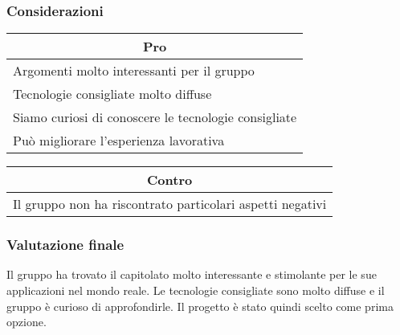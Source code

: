 \subsubsection{Considerazioni}
\begin{minipage}[t]{0.45\linewidth}
    \vspace{0pt}
    {\renewcommand{\arraystretch}{1.5}
    \begin{tabular}{p{1\linewidth}}
        \multicolumn{1}{c}{\textbf{Pro}} \\
        \midrule
        Argomenti molto interessanti per il gruppo \\
        Tecnologie consigliate molto diffuse \\
        Siamo curiosi di conoscere le tecnologie consigliate \\
        Può migliorare l’esperienza lavorativa  \\
        \hline
    \end{tabular}
    }
\end{minipage}
\hspace{0.05\linewidth}
\begin{minipage}[t]{0.45\linewidth}
    \vspace{0pt}
    {\renewcommand{\arraystretch}{1.5}
    \begin{tabular}{p{1\linewidth}}
        \multicolumn{1}{c}{\textbf{Contro}} \\
        \midrule
        Il gruppo non ha riscontrato particolari aspetti negativi \\
        \hline
    \end{tabular}
    }
\end{minipage}
\vspace{1em}

\subsubsection{Valutazione finale}
Il gruppo ha trovato il capitolato molto interessante e stimolante per le sue applicazioni nel mondo reale. Le tecnologie consigliate sono molto diffuse e il gruppo è curioso di approfondirle. Il progetto è stato quindi scelto come prima opzione.